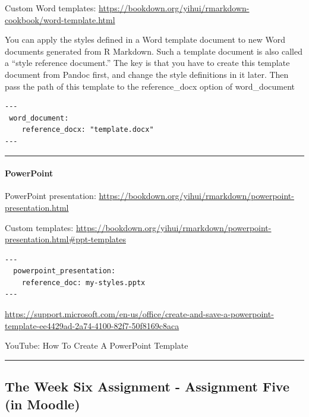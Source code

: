 \documentclass[
]{article}
\begin{document}
Custom Word templates:
\url{https://bookdown.org/yihui/rmarkdown-cookbook/word-template.html}

You can apply the styles defined in a Word template document to new Word
documents generated from R Markdown. Such a template document is also
called a ``style reference document.'' The key is that you have to
create this template document from Pandoc first, and change the style
definitions in it later. Then pass the path of this template to the
reference\_docx option of word\_document

\begin{verbatim}
---
 word_document:
    reference_docx: "template.docx"
---
\end{verbatim}

\begin{center}\rule{0.5\linewidth}{0.5pt}\end{center}

\hypertarget{powerpoint}{%
\paragraph{PowerPoint}\label{powerpoint}}

PowerPoint presentation:
\url{https://bookdown.org/yihui/rmarkdown/powerpoint-presentation.html}

Custom templates:
\url{https://bookdown.org/yihui/rmarkdown/powerpoint-presentation.html\#ppt-templates}

\begin{verbatim}
---
  powerpoint_presentation:
    reference_doc: my-styles.pptx
---
\end{verbatim}

\url{https://support.microsoft.com/en-us/office/create-and-save-a-powerpoint-template-ee4429ad-2a74-4100-82f7-50f8169c8aca}

YouTube: How To Create A PowerPoint Template

\begin{center}\rule{0.5\linewidth}{0.5pt}\end{center}

\hypertarget{the-week-six-assignment---assignment-five-in-moodle}{%
\subsection{The Week Six Assignment - Assignment Five (in
Moodle)}\label{the-week-six-assignment---assignment-five-in-moodle}}
\end{document}
